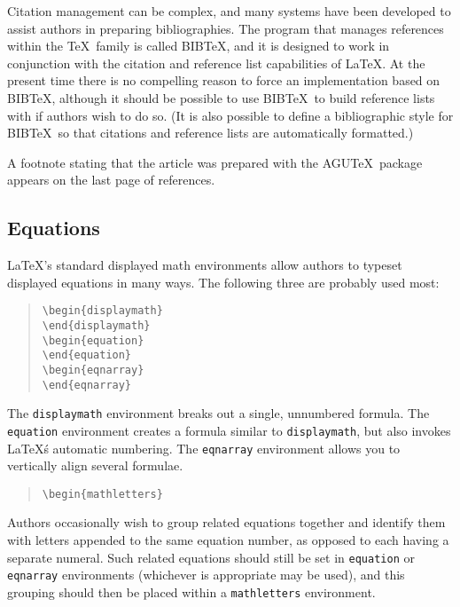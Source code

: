 Citation management can be complex, and many systems have been developed 
to assist authors in preparing bibliographies.  The program that manages 
references within the \TeX\ family is called BIB\TeX, and it is designed 
to work in conjunction with the citation and reference list capabilities 
of \LaTeX.  At the present time there is no compelling reason to force an 
implementation based on BIB\TeX, although it should be possible to use 
BIB\TeX\ to build reference lists with if authors wish to do so.  (It is 
also possible to define a bibliographic style for BIB\TeX\ so that 
citations and reference lists are automatically formatted.)

A footnote stating that the article was prepared with the AGU\TeX\ 
package appears on the last page of references.

\subsection{Equations}

\LaTeX's standard displayed math environments allow authors to typeset 
displayed equations in many ways.  The following three are probably used 
most:
\begin{quote}
\verb"\begin{displaymath}"\\
\verb"\end{displaymath}"\\[.8ex]
\verb"\begin{equation}"\\
\verb"\end{equation}"\\[.8ex]
\verb"\begin{eqnarray}"\\
\verb"\end{eqnarray}"
\end{quote}
The {\tt displaymath} environment breaks out a single, unnumbered formula.  
The {\tt equation} environment creates a formula similar to {\tt displaymath}, 
but also invokes \LaTeX\'s automatic numbering.  The {\tt eqnarray} 
environment allows you to vertically align several formulae. 

\begin{quote}
\verb"\begin{mathletters}"
\end{quote}

Authors occasionally wish to group related equations together and identify 
them with letters appended to the same equation number, as opposed to each 
having a separate numeral.  Such related equations should still be set in 
{\tt equation} or {\tt eqnarray} environments (whichever is appropriate may 
be used), and this grouping should then be placed within a {\tt mathletters} 
environment.

